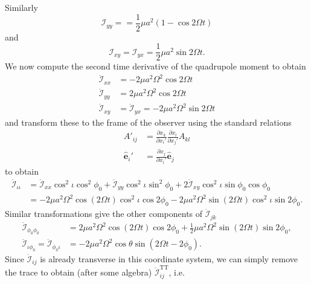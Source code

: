 Similarly
\begin{equation}
\mathcal{I}_{yy} =
= \frac{1}{2} \mu a^2 \left(1 - \cos 2 \Omega t \right)
\end{equation}
and 
\begin{equation}
\mathcal{I}_{xy} =
\mathcal{I}_{yx} =
\frac{1}{2} \mu a^2 \sin 2 \Omega t.
\end{equation}
We now compute the second time derivative of the quadrupole moment to obtain
\begin{align}
\ddot{\mathcal{I}}_{xx} &= - 2\mu a^2 \Omega^2 \cos 2\Omega t \\
\ddot{\mathcal{I}}_{yy} &= 2\mu a^2 \Omega^2 \cos 2\Omega t \\
\ddot{\mathcal{I}}_{xy} &=
\ddot{\mathcal{I}}_{yx} = - 2\mu a^2 \Omega^2 \sin 2\Omega t
\end{align}
and transform these to the frame of the observer using the standard relations
\begin{align}
A'_{ij} &= 
\frac{\partial x_k}{\partial x_i'}
\frac{\partial x_l}{\partial x_j'} A_{kl} \\
\hat{\boldsymbol{e}}_{i}' &= 
\frac{\partial x_j}{\partial x_i'}\hat{\boldsymbol{e}}_{j}
\end{align}
to obtain
\begin{equation}
\begin{split}
\ddot{\mathcal{I}}_{\iota\iota} &= 
\ddot{\mathcal{I}}_{xx} \cos^2 \iota \cos^2 \phi_0 
+  \ddot{\mathcal{I}}_{yy} \cos^2 \iota \sin^2 \phi_0 
+ 2  \ddot{\mathcal{I}}_{xy} \cos^2\iota\sin\phi_0\cos\phi_0 \\
&= - 2\mu a^2 \Omega^2 \cos(2\Omega t) \cos^2\iota \cos 2\phi_0
-2 \mu a^2 \Omega^2 \sin(2\Omega t) \cos^2\iota \sin 2\phi_0.
\end{split}
\end{equation}
Similar transformations give the other components of $\ddot{\mathcal{I}}_{jk}$
\begin{align}
\ddot{\mathcal{I}}_{\phi_0\phi_0} &=
2\mu a^2 \Omega^2 \cos(2\Omega t) \cos 2\phi_0
+ \frac{1}{2} \mu a^2 \Omega^2 \sin(2\Omega t) \sin 2\phi_0, \\
\ddot{\mathcal{I}}_{\iota\phi_0} = 
\ddot{\mathcal{I}}_{\phi_0\iota} &= 
- 2 \mu a^2 \Omega^2 \cos\theta \sin\left(2\Omega t - 2\phi_0\right).
\end{align}
Since $\ddot{\mathcal{I}}_{ij}$ is already transverse in this coordinate
system, we can simply remove the trace to obtain (after some algebra)
$\ddot{\mathcal{I}}_{ij}^\mathrm{TT}$, i.e.
